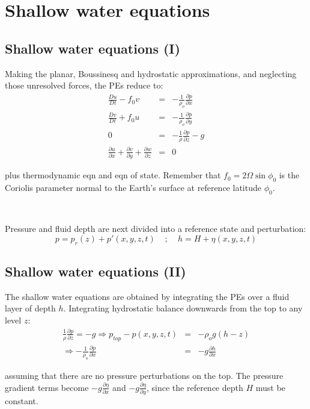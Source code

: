 \documentclass[11pt,fleqn]{book} %
\newcommand{\partd}[2]{\frac{\partial #1}{\partial #2}}
\newcommand{\lagd}[2]{\frac{D #1}{D #2}}
\begin{document}
\section{Shallow water equations}
\subsection{Shallow water equations (I)} 
	
Making the planar, Boussinesq and hydrostatic approximations, and neglecting those unresolved forces, 
	the PEs reduce to:
	\begin{eqnarray}
		\lagd{u}{t}-f_0 v & = & -\frac{1}{\rho_o}\partd{p}{x} \\
		\lagd{v}{t}+f_0 u & = & -\frac{1}{\rho_o}\partd{p}{y} \\
		0 & = & - \frac{1}{\rho} \partd{p}{z} - g \\
		\partd{u}{x}+\partd{v}{y}+\partd{w}{z} & = & 0
	\end{eqnarray}
	
	plus thermodynamic eqn and eqn of state. Remember that $f_0=2\Omega \sin\phi_0$ is the Coriolis parameter normal to the Earth's surface at
	reference latitude $\phi_0$.
	
	~
	
	Pressure and fluid depth are next divided into
	a reference state and perturbation:
	\begin{equation*}
		p=p_r(z)+p'(x,y,z,t)~~~~~;~~~~~h=H+\eta(x,y,z,t)
	\end{equation*}
	

\subsection{Shallow water equations (II)} 
	
	 The shallow water equations are obtained by integrating the PEs
	over a fluid layer of depth $h$. Integrating hydrostatic balance
	downwards from the top to any level $z$:
	\begin{eqnarray*}
		\frac{1}{\rho}\partd{p}{z}=-g \Rightarrow p_{top}-p(x,y,z,t) & = & -\rho_o g (h-z) \\
		\Rightarrow -\frac{1}{\rho_o} \partd{p}{x} & = & -g \partd{h}{x}
	\end{eqnarray*}
	
	assuming that there are no pressure perturbations on the top.
	The pressure gradient terms become $-g\partd{\eta}{x}$ and
	$-g\partd{\eta}{y}$, since the reference depth $H$ must be constant.
	
\end{document}
